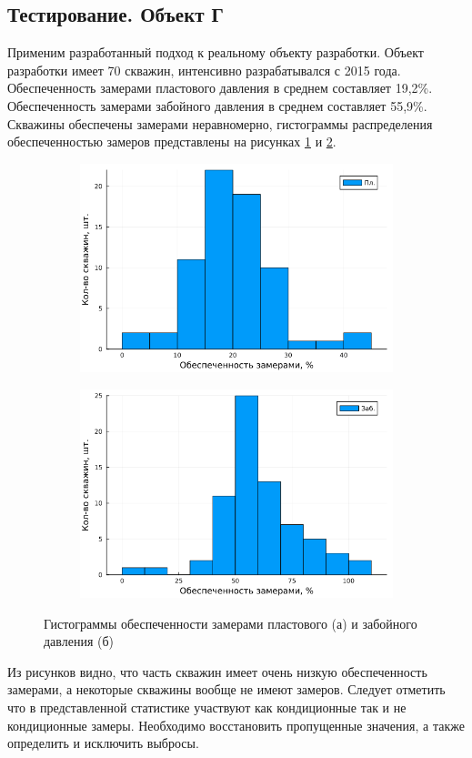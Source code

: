 \documentclass[14pt]{article}
\begin{document}
\subsection{Тестирование. Объект Г}
Применим разработанный подход к реальному объекту разработки. Объект разработки имеет 70 скважин, интенсивно разрабатывался с 2015 года. Обеспеченность замерами пластового давления  в среднем составляет 19,2\%. Обеспеченность замерами забойного давления в среднем составляет 55,9\%. Скважины обеспечены замерами неравномерно, гистограммы распределения обеспеченностью замеров представлены на рисунках \ref{fig:gar_hist_ppl_a} и \ref{fig:gar_hist_pw_b}. 
\begin{figure}[!htb]
	\begin{subfigure}[b]{0.45\linewidth}
		\includegraphics[width=\linewidth]{pic/hist_gar_ppl}
		\caption{}
		\label{fig:gar_hist_ppl_a}
	\end{subfigure}
	\begin{subfigure}[b]{0.45\linewidth}
		\includegraphics[width=\linewidth]{pic/hist_gar_pw}
		\caption{}
		\label{fig:gar_hist_pw_b}
	\end{subfigure}
	\label{fig:gar_hist}
	\caption{Гистограммы обеспеченности замерами пластового (а) и забойного давления (б)}
\end{figure}
Из рисунков видно, что часть скважин имеет очень низкую обеспеченность замерами, а некоторые скважины вообще не имеют замеров. Следует отметить что в представленной статистике участвуют как кондиционные так и не кондиционные замеры. Необходимо восстановить пропущенные значения, а также определить и исключить выбросы. 
\end{document}
